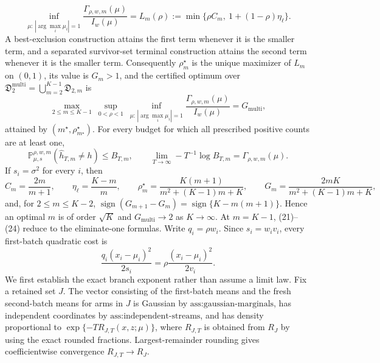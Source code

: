 \[
 \inf_{\mu:\,|\arg\max_i\mu_i|=1}
 \frac{\Gamma_{\rho,w,m}(\mu)}{I_w(\mu)}
 =L_m(\rho):=\min\{\rho C_m,\ 1+(1-\rho)\eta_\ell\}. \tag{22}
\]
A best-exclusion construction attains the first term whenever it is the smaller term, and a separated survivor-set terminal construction attains the second term whenever it is the smaller term. Consequently \(\rho_m^\star\) is the unique maximizer of \(L_m\) on \((0,1)\), its value is \(G_m>1\), and the certified optimum over \(\mathfrak D_2^{\mathrm{multi}}=\bigcup_{m=2}^{K-1}\mathfrak D_{2,m}\) is
\[
 \max_{2\le m\le K-1}\ \sup_{0<\rho<1}\ \inf_{\mu:\,|\arg\max_i\mu_i|=1}
 \frac{\Gamma_{\rho,w,m}(\mu)}{I_w(\mu)}=G_{\mathrm{multi}},
\]
attained by \((m^\star,\rho_{m^\star}^\star)\). For every budget for which all prescribed positive counts are at least one,
\[
 \mathbb P_{\mu,s}^{\rho,w,m}(\widehat h_{T,m}\ne h)\le B_{T,m},
 \qquad
 \lim_{T\to\infty}-T^{-1}\log B_{T,m}=\Gamma_{\rho,w,m}(\mu). \tag{23}
\]
If \(s_i=\sigma^2\) for every \(i\), then
\[
 C_m=\frac{2m}{m+1},\qquad \eta_\ell=\frac{K-m}{m},\qquad
 \rho_m^\star=\frac{K(m+1)}{m^2+(K-1)m+K},\qquad
 G_m=\frac{2mK}{m^2+(K-1)m+K}, \tag{24}
\]
and, for \(2\le m\le K-2\), \(\operatorname{sign}(G_{m+1}-G_m)=\operatorname{sign}\{K-m(m+1)\}\). Hence an optimal \(m\) is of order \(\sqrt K\) and \(G_{\mathrm{multi}}\to2\) as \(K\to\infty\). At \(m=K-1\), (21)--(24) reduce to the eliminate-one formulas.
Write \(q_i=\rho w_i\). Since \(s_i=w_iv_i\), every first-batch quadratic cost is
\[
 \frac{q_i(x_i-\mu_i)^2}{2s_i}=\rho\frac{(x_i-\mu_i)^2}{2v_i}. \tag{25}
\]
We first establish the exact branch exponent rather than assume a limit law. Fix a retained set \(J\). The vector consisting of the first-batch means and the fresh second-batch means for arms in \(J\) is Gaussian by \(\text{ass:gaussian-marginals}\), has independent coordinates by \(\text{ass:independent-streams}\), and has density proportional to \(\exp\{-T R_{J,T}(x,z;\mu)\}\), where \(R_{J,T}\) is obtained from \(R_J\) by using the exact rounded fractions. Largest-remainder rounding gives coefficientwise convergence \(R_{J,T}\to R_J\).

